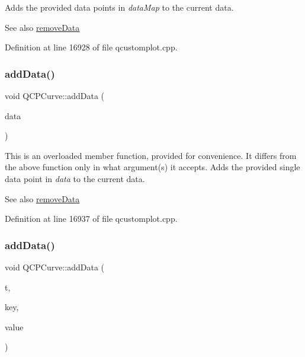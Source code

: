 Adds the provided data points in {\itshape data\+Map} to the current data. \begin{DoxySeeAlso}{See also}
\hyperlink{class_q_c_p_curve_ad45bb5479be799163028ef2b776f7221}{remove\+Data} 
\end{DoxySeeAlso}


Definition at line 16928 of file qcustomplot.\+cpp.

\mbox{\label{class_q_c_p_curve_ad304326aba096911f92452d8bfe0470e}} 
\subsubsection{\texorpdfstring{add\+Data()}{addData()}\hspace{0.1cm}{\footnotesize\ttfamily [2/5]}}
{\footnotesize\ttfamily void Q\+C\+P\+Curve\+::add\+Data (\begin{DoxyParamCaption}\item[{const \hyperlink{class_q_c_p_curve_data}{Q\+C\+P\+Curve\+Data} \&}]{data }\end{DoxyParamCaption})}

This is an overloaded member function, provided for convenience. It differs from the above function only in what argument(s) it accepts. Adds the provided single data point in {\itshape data} to the current data. \begin{DoxySeeAlso}{See also}
\hyperlink{class_q_c_p_curve_ad45bb5479be799163028ef2b776f7221}{remove\+Data} 
\end{DoxySeeAlso}


Definition at line 16937 of file qcustomplot.\+cpp.

\mbox{\label{class_q_c_p_curve_a13398b236f6926014e404eeb5b9f415c}} 
\subsubsection{\texorpdfstring{add\+Data()}{addData()}\hspace{0.1cm}{\footnotesize\ttfamily [3/5]}}
{\footnotesize\ttfamily void Q\+C\+P\+Curve\+::add\+Data (\begin{DoxyParamCaption}\item[{double}]{t,  }\item[{double}]{key,  }\item[{double}]{value }\end{DoxyParamCaption})}

